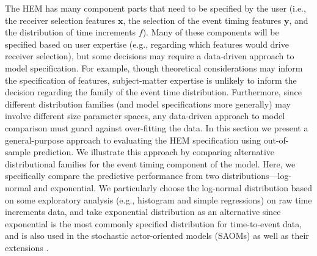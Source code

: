 \documentclass[ba]{imsart}
\numberwithin{equation}{section}
\theoremstyle{plain}
\begin{document}
	The HEM has many component parts that need to be specified by the user (i.e., the receiver selection features $\boldsymbol{x}$, the selection of the event timing features $\boldsymbol{y}$, and the distribution of time increments $f$). Many of these components will be specified based on user expertise (e.g., regarding which features would drive receiver selection), but some decisions may require a data-driven approach to model specification. For example, though theoretical considerations may inform the specification of features, subject-matter expertise is unlikely to inform the decision regarding the family of the event time distribution. Furthermore, since different distribution families (and model specifications more generally) may involve different size parameter spaces, any data-driven approach to model comparison must guard against over-fitting the data. In this section we present a general-purpose approach to evaluating the HEM specification using out-of-sample prediction. We illustrate this approach by comparing alternative distributional families for the event timing component of the model. Here, we specifically compare the predictive performance from two distributions---log-normal and exponential. We particularly choose the log-normal distribution based on some exploratory analysis (e.g., histogram and simple regressions) on raw time increments data, and take exponential distribution as an alternative since exponential is the most commonly specified distribution for time-to-event data, and is also used in the stochastic actor-oriented models (SAOMs) \citep{snijders1996stochastic} as well as their extensions \citep{snijders2007modeling}. 
\end{document}
